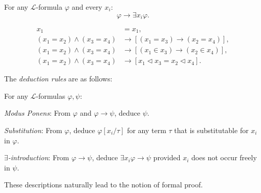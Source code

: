 \begin{definition}
    \label{def:Spec.Axiom}
    \leanok
    For any $\mathcal{L}$-formula $\varphi$ and every $x_i$:
    $$\varphi \rightarrow \exists x_i \varphi.$$
\end{definition}

\begin{definition}
    \label{def:Equality.Axioms}
    \leanok
    $$
    \begin{aligned}
        x_1 & = x_1, \\
        \left(x_1=x_2\right) \land \left(x_3=x_4\right) & 
        \rightarrow \left[\left(x_1=x_3\right) \rightarrow \left(x_2=x_4\right)\right], \\
        \left(x_1=x_2\right) \land \left(x_3=x_4\right) & 
        \rightarrow \left[\left(x_1 \in x_3\right) \rightarrow \left(x_2 \in x_4\right)\right], \\
        \left(x_1=x_2\right) \land \left(x_3=x_4\right) & 
        \rightarrow \left[x_1 \lhd x_3 = x_2 \lhd x_4 \right]. 
    \end{aligned}
    $$
\end{definition}

The \textit{deduction rules} are as follows:

\begin{definition}
    \label{def:Prf.mp+Prf.subst+Prf.exists_intro}
    \leanok
    For any $\mathcal{L}$-formulas $\varphi, \psi$:
    \begin{description}
        \item \textit{Modus Ponens}: 
        From $\varphi$ and $\varphi \rightarrow \psi$, deduce $\psi$.
        \item \textit{Substitution}:
        From $\varphi$, deduce $\varphi[x_i/\tau]$ for any term $\tau$ that is substitutable for
        $x_i$ in $\varphi$.
        \item \textit{$\exists$-introduction}:
        From $\varphi \rightarrow \psi$, deduce $\exists x_i \varphi \rightarrow \psi$ provided
        $x_i$ does not occur freely in $\psi$.
    \end{description}
\end{definition}

These descriptions naturally lead to the notion of formal proof.


